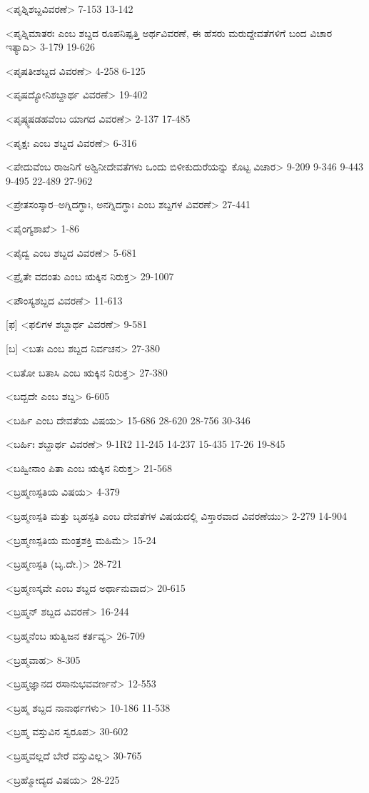 <ಪೃಶ್ನಿಶಬ್ದವಿವರಣೆ>
7-153 
13-142

<ಪೃಶ್ನಿಮಾತರಃ ಎಂಬ ಶಬ್ದದ ರೂಪನಿಷ್ಪತ್ತಿ ಅರ್ಥವಿವರಣೆ, ಈ ಹೆಸರು ಮರುದ್ದೇವತೆಗಳಿಗೆ ಬಂದ ವಿಚಾರ ಇತ್ಯಾದಿ>
3-179 
19-626

<ಪೃಷತೀಶಬ್ದದ ವಿವರಣೆ>
4-258 
6-125

<ಪೃಷದ್ಯೋನಿಶಬ್ದಾರ್ಥ ವಿವರಣೆ>
19-402

<ಪೃಷ್ಠ್ಯಷಡಹವೆಂಬ ಯಾಗದ ವಿವರಣೆ>
2-137 
17-485

<ಪೃಕ್ಷಃ ಎಂಬ ಶಬ್ದದ ವಿವರಣೆ>
6-316

<ಪೇದುವೆಂಬ ರಾಜನಿಗೆ ಅಶ್ವಿನೀದೇವತೆಗಳು ಒಂದು ಬಿಳೀಕುದುರೆಯನ್ನು ಕೊಟ್ಟ ವಿಚಾರ>
9-209 
9-346
9-443 
9-495
22-489 
27-962

<ಪ್ರೇತಸಂಸ್ಕಾರ–ಅಗ್ನಿದಗ್ಧಾಃ, ಅನಗ್ನಿದಗ್ಧಾಃ ಎಂಬ ಶಬ್ದಗಳ ವಿವರಣೆ>
27-441


<ಪೈಂಗ್ಯಶಾಖೆ>
1-86

<ಪೈದ್ವ ಎಂಬ ಶಬ್ದದ ವಿವರಣೆ>
5-681

<ಪ್ರೈತೇ ವದಂತು ಎಂಬ ಋಕ್ಕಿನ ನಿರುಕ್ತ>
29-1007

<ಪೌಂಸ್ಯಶಬ್ದದ ವಿವರಣೆ>
11-613

[ಫ]
<ಫಲಿಗಳ ಶಬ್ದಾರ್ಥ ವಿವರಣೆ>
9-581

[ಬ]
<ಬತಃ ಎಂಬ ಶಬ್ದದ ನಿರ್ವಚನ>
27-380

<ಬತೋ ಬತಾಸಿ ಎಂಬ ಋಕ್ಕಿನ ನಿರುಕ್ತ>
27-380

<ಬದ್ಬದೇ ಎಂಬ ಶಬ್ದ>
6-605

<ಬರ್ಹಿ ಎಂಬ ದೇವತೆಯ ವಿಷಯ>
15-686 
28-620
28-756
30-346

<ಬರ್ಹಿಃ ಶಬ್ದಾರ್ಥ ವಿವರಣೆ>
9-1R2 
11-245 
14-237 
15-435 
17-26
19-845

<ಬಹ್ವೀನಾಂ ಪಿತಾ ಎಂಬ ಋಕ್ಕಿನ ನಿರುಕ್ತ>
21-568

<ಬ್ರಹ್ಮಣಸ್ಪತಿಯ ವಿಷಯ>
4-379

<ಬ್ರಹ್ಮಣಸ್ಪತಿ ಮತ್ತು ಬೃಹಸ್ಪತಿ ಎಂಬ ದೇವತೆಗಳ ವಿಷಯದಲ್ಲಿ ವಿಸ್ತಾರವಾದ ವಿವರಣೆಯು>
2-279
14-904

<ಬ್ರಹ್ಮಣಸ್ಪತಿಯ ಮಂತ್ರಶಕ್ತಿ ಮಹಿಮೆ>
15-24

<ಬ್ರಹ್ಮಣಸ್ಪತಿ (ಬೃ.ದೇ.)>
28-721

<ಬ್ರಹ್ಮಣಸ್ಕವೇ ಎಂಬ ಶಬ್ದದ ಅರ್ಥಾನುವಾದ>
20-615

<ಬ್ರಹ್ಮನ್‍ ಶಬ್ದದ ವಿವರಣೆ>
16-244

<ಬ್ರಹ್ಮನೆಂಬ ಋತ್ವಿಜನ ಕರ್ತವ್ಯ>
26-709

<ಬ್ರಹ್ಮವಾಹ>
8-305

<ಬ್ರಹ್ಮಜ್ಞಾನದ ರಸಾನುಭವವರ್ಣನೆ>
12-553

<ಬ್ರಹ್ಮ ಶಬ್ದದ ನಾನಾರ್ಥಗಳು>
10-186
11-538

<ಬ್ರಹ್ಮ ವಸ್ತುವಿನ ಸ್ವರೂಪ>
30-602

<ಬ್ರಹ್ಮವಲ್ಲದೆ ಬೇರೆ ವಸ್ತುವಿಲ್ಲ>
30-765

<ಬ್ರಹ್ಮೋದ್ಯದ ವಿಷಯ>
28-225

